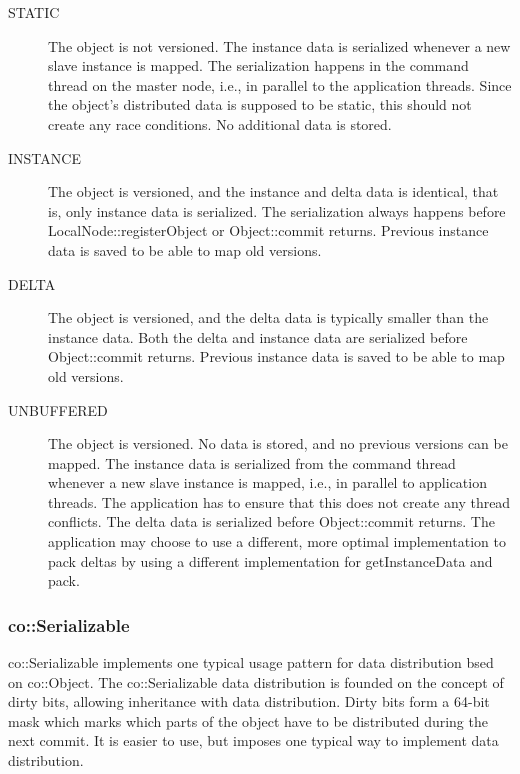 \documentclass[10pt,a4]{scrartcl}
\begin{document}
\begin{description}
  \item[STATIC] The object is not versioned. The instance data is serialized
    whenever a new slave instance is mapped. The serialization happens in the
    command thread on the master node, i.e., in parallel to the application
    threads. Since the object's distributed data is supposed to be static, this
    should not create any race conditions. No additional data is stored.
  \item[INSTANCE] The object is versioned, and the instance and delta data is
    identical, that is, only instance data is serialized. The serialization
    always happens before \textsf{LocalNode::registerObject} or
    \textsf{Object::commit} returns. Previous instance data is saved to be able
    to map old versions.
  \item[DELTA] The object is versioned, and the delta data is typically smaller
    than the instance data. Both the delta and instance data are serialized
    before \textsf{Object::commit} returns. Previous instance data is saved to
    be able to map old versions.
  \item[UNBUFFERED] The object is versioned. No data is stored, and no previous
    versions can be mapped. The instance data is serialized from the command
    thread whenever a new slave instance is mapped, i.e., in parallel to
    application threads. The application has to ensure that this does not create
    any thread conflicts. The delta data is serialized before
    \textsf{Object::commit} returns. The application may choose to use a
    different, more optimal implementation to pack deltas by using a different
    implementation for \textsf{getInstanceData} and \textsf{pack}.
\end{description}


\subsubsection{\label{sSerializable}co::Serializable}

\textsf{co::Serializable} implements one typical usage pattern for data
distribution bsed on \textsf{co::Object}. The \textsf{co::Serializable} data
distribution is founded on the concept of dirty bits, allowing inheritance with
data distribution. Dirty bits form a 64-bit mask which marks which parts of the
object have to be distributed during the next commit. It is easier to use, but
imposes one typical way to implement data distribution.
\end{document}
